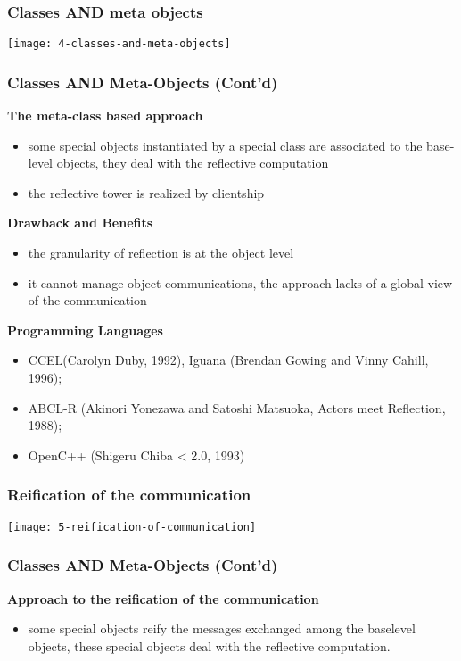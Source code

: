 \subsubsection{Classes AND meta objects}

\begin{center}
\texttt{[image: 4-classes-and-meta-objects]}
\end{center}

\subsubsection{Classes AND Meta-Objects (Cont'd)}
\textbf{The meta-class based approach}
\begin{itemize}
	\item some special objects instantiated by a special class are associated to the base-level objects, they deal with the reflective computation
	\item the reflective tower is realized by clientship
\end{itemize}

\textbf{Drawback and Benefits}
\begin{itemize}
	\item the granularity of reflection is at the object level
	\item it cannot manage object communications, the approach lacks of a global view of the communication
\end{itemize}

\textbf{Programming Languages}
\begin{itemize}
	\item CCEL(Carolyn Duby, 1992), Iguana (Brendan Gowing and Vinny Cahill, 1996);
	\item ABCL-R (Akinori Yonezawa and Satoshi Matsuoka, Actors meet Reflection, 1988);
	\item OpenC++ (Shigeru Chiba < 2.0, 1993)
\end{itemize}

\subsubsection{Reification of the communication}

\begin{center}
\texttt{[image: 5-reification-of-communication]}
\end{center}

\subsubsection{Classes AND Meta-Objects (Cont'd)}
\textbf{Approach to the reification of the communication}
\begin{itemize}
	\item some special objects reify the messages exchanged among the baselevel objects, these special objects deal with the reflective computation.
\end{itemize}

